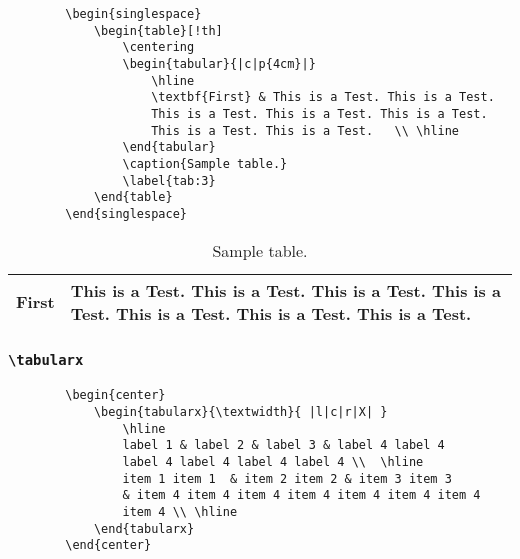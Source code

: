 \begin{SBN}
	\begin{verbatim}
		\begin{singlespace}
			\begin{table}[!th]
				\centering  
				\begin{tabular}{|c|p{4cm}|}
					\hline
					\textbf{First} & This is a Test. This is a Test. 
					This is a Test. This is a Test. This is a Test. 
					This is a Test. This is a Test.   \\ \hline
				\end{tabular}
				\caption{Sample table.}
				\label{tab:3}
			\end{table}
		\end{singlespace}    
	\end{verbatim}
\end{SBN}

\begin{singlespace}
	\begin{table}[!th]
		\centering  
		\begin{tabular}{|c|p{4cm}|}
			\hline
			\textbf{First} & This is a Test. This is a Test. This is a Test. This is a Test. This is a Test. This is a Test. This is a Test.   \\ \hline
		\end{tabular}
		\caption{Sample table.}
		\label{tab:3}
	\end{table}
\end{singlespace}


\subsubsection{\texttt{\textbackslash tabularx}}

\begin{SBN}
	\begin{verbatim}
		\begin{center}
			\begin{tabularx}{\textwidth}{ |l|c|r|X| }
				\hline
				label 1 & label 2 & label 3 & label 4 label 4 
				label 4 label 4 label 4 label 4 \\  \hline 
				item 1 item 1  & item 2 item 2 & item 3 item 3 
				& item 4 item 4 item 4 item 4 item 4 item 4 item 4 
				item 4 \\ \hline
			\end{tabularx} 
		\end{center}
	\end{verbatim}
\end{SBN}


